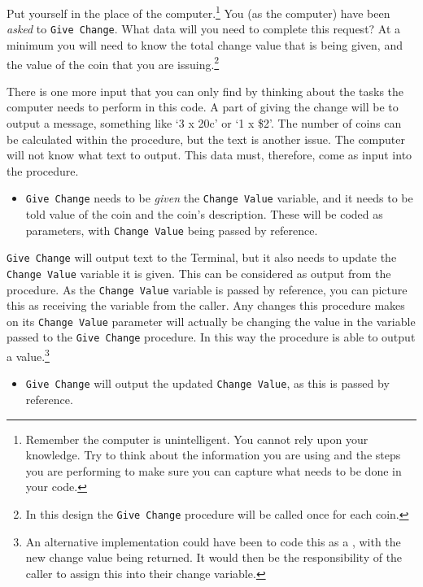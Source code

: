 Put yourself in the place of the computer.\footnote{Remember the computer is unintelligent. You cannot rely upon your knowledge. Try to think about the information you are using and the steps you are performing to make sure you can capture what needs to be done in your code.} You (as the computer) have been \emph{asked} to \texttt{Give Change}. What data will you need to complete this request? At a minimum you will need to know the total change value that is being given, and the value of the coin that you are issuing.\footnote{In this design the \texttt{Give Change} procedure will be called once for each coin.}

There is one more input that you can only find by thinking about the tasks the computer needs to perform in this code. A part of giving the change will be to output a message, something like `3 x 20c' or `1 x \$2'. The number of coins can be calculated within the procedure, but the text is another issue. The computer will not know what text to output. This data must, therefore, come as input into the procedure.

\begin{itemize}
  \item \texttt{Give Change} needs to be \emph{given} the \texttt{Change Value} variable, and it needs to be told value of the coin and the coin's description. These will be coded as parameters, with \texttt{Change Value} being passed by reference.
\end{itemize}

\texttt{Give Change} will output text to the Terminal, but it also needs to update the \texttt{Change Value} variable it is given. This can be considered as output from the procedure. As the \texttt{Change Value} variable is passed by reference, you can picture this as receiving the variable from the caller. Any changes this procedure makes on its \texttt{Change Value} parameter will actually be changing the value in the variable passed to the \texttt{Give Change} procedure. In this way the procedure is able to output a value.\footnote{An alternative implementation could have been to code this as a , with the new change value being returned. It would then be the responsibility of the caller to assign this into their change variable.}

\begin{itemize}
  \item \texttt{Give Change} will output the updated \texttt{Change Value}, as this is passed by reference.
\end{itemize}

